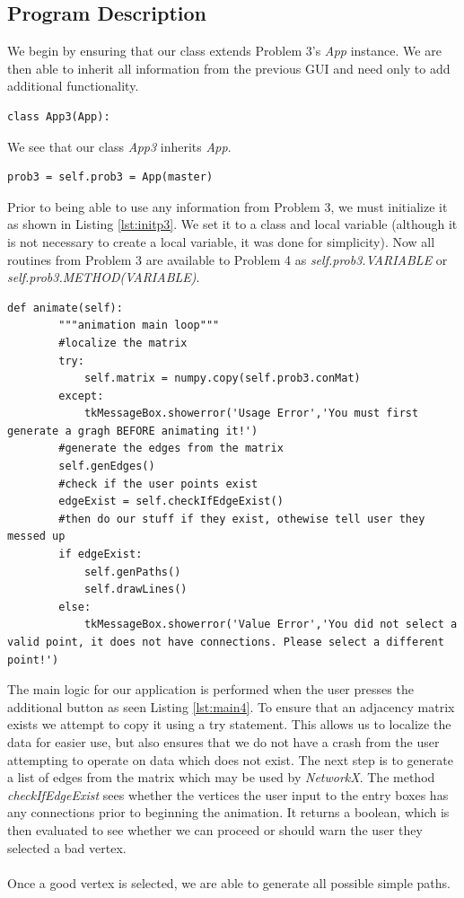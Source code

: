 \subsection{Program Description} %
\label{sub:program_description4}
We begin by ensuring that our class extends Problem 3's \emph{App} instance. We are then able to inherit all information from the previous GUI and need only to add additional functionality.
\begin{lstlisting}[caption={Inheritance of Problem 4}, label=lst:inherit,firstnumber=5]
class App3(App):
\end{lstlisting}\noindent
We see that our class \emph{App3} inherits \emph{App}. 
\begin{lstlisting}[caption={Initialization of Problem 3}, label=lst:initp3,firstnumber=12]
    prob3 = self.prob3 = App(master)
\end{lstlisting}\noindent
Prior to being able to use any information from Problem 3, we must initialize it as shown in Listing \ref{lst:initp3}. We set it to a class and local variable (although it is not necessary to create a local variable, it was done for simplicity). Now all routines from Problem 3 are available to Problem 4 as \emph{self.prob3.VARIABLE} or \emph{self.prob3.METHOD(VARIABLE)}.
\begin{lstlisting}[caption={Main Logic}, label=lst:main4,firstnumber=30]
    def animate(self):
        """animation main loop"""
        #localize the matrix
        try:
            self.matrix = numpy.copy(self.prob3.conMat)
        except:
            tkMessageBox.showerror('Usage Error','You must first generate a gragh BEFORE animating it!')
        #generate the edges from the matrix
        self.genEdges()
        #check if the user points exist
        edgeExist = self.checkIfEdgeExist()
        #then do our stuff if they exist, othewise tell user they messed up
        if edgeExist:
            self.genPaths()
            self.drawLines()
        else:
            tkMessageBox.showerror('Value Error','You did not select a valid point, it does not have connections. Please select a different point!')
\end{lstlisting}\noindent
The main logic for our application is performed when the user presses the additional button as seen Listing \ref{lst:main4}. To ensure that an adjacency matrix exists we attempt to copy it using a try statement. This allows us to localize the data for easier use, but also ensures that we do not have a crash from the user attempting to operate on data which does not exist. The next step is to generate a list of edges from the matrix which may be used by \emph{NetworkX}. The method \emph{checkIfEdgeExist} sees whether the vertices the user input to the entry boxes has any connections prior to beginning the animation. It returns a boolean, which is then evaluated to see whether we can proceed or should warn the user they selected a bad vertex.\\\\
Once a good vertex is selected, we are able to generate all possible simple paths.

